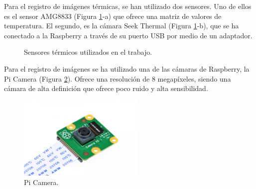 Para el registro de imágenes térmicas, se han utilizado dos sensores. Uno de ellos es el sensor AMG8833 (Figura \ref{fig:termicos}-a) que ofrece una matriz de valores de temperatura. El segundo, es la cámara Seek Thermal (Figura \ref{fig:termicos}-b), que se ha conectado a la Raspberry a través de su puerto USB por medio de un adaptador.\\
\begin{figure}[h!]
  \begin{center}
    \hspace{2mm}
  \end{center}
\caption{Sensores térmicos utilizados en el trabajo.} \label{fig:termicos}
\end{figure}

Para el registro de imágenes se ha utilizado una de las cámaras de Raspberry, la Pi Camera (Figura \ref{fig:picam_of}). Ofrece una resolución de 8 megapíxeles, siendo una cámara de alta definición que ofrece poco ruido y alta sensibilidad.
\begin{figure} [h!]
  \begin{center}
    \includegraphics[width=6cm]{figs/picam_of}
  \end{center}
  \caption{Pi Camera.}
  \label{fig:picam_of}
\end{figure}

